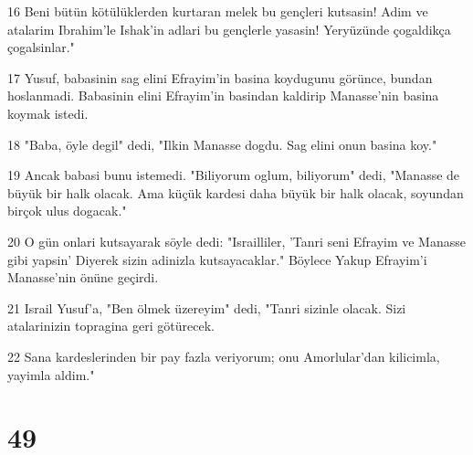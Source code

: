 \par 16 Beni bütün kötülüklerden kurtaran melek bu gençleri kutsasin! Adim ve atalarim Ibrahim'le Ishak'in adlari bu gençlerle yasasin! Yeryüzünde çogaldikça çogalsinlar."
\par 17 Yusuf, babasinin sag elini Efrayim'in basina koydugunu görünce, bundan hoslanmadi. Babasinin elini Efrayim'in basindan kaldirip Manasse'nin basina koymak istedi.
\par 18 "Baba, öyle degil" dedi, "Ilkin Manasse dogdu. Sag elini onun basina koy."
\par 19 Ancak babasi bunu istemedi. "Biliyorum oglum, biliyorum" dedi, "Manasse de büyük bir halk olacak. Ama küçük kardesi daha büyük bir halk olacak, soyundan birçok ulus dogacak."
\par 20 O gün onlari kutsayarak söyle dedi: "Israilliler, 'Tanri seni Efrayim ve Manasse gibi yapsin' Diyerek sizin adinizla kutsayacaklar." Böylece Yakup Efrayim'i Manasse'nin önüne geçirdi.
\par 21 Israil Yusuf'a, "Ben ölmek üzereyim" dedi, "Tanri sizinle olacak. Sizi atalarinizin topragina geri götürecek.
\par 22 Sana kardeslerinden bir pay fazla veriyorum; onu Amorlular'dan kilicimla, yayimla aldim."

\chapter{49}

